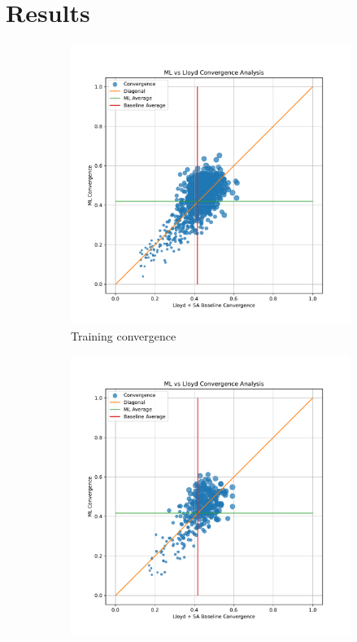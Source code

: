 \documentclass{article}
\begin{document}
\section{Results}

\begin{figure}[h]
  \centering
  \begin{subfigure}[t]{0.49\textwidth}
    \centering
    \includegraphics[width=\textwidth]{train_convergence.pdf}
    \caption{Training convergence}
  \end{subfigure}
  \begin{subfigure}[t]{0.49\textwidth}
    \centering
    \includegraphics[width=\textwidth]{test_convergence.pdf}

\end{subfigure}
\end{figure}
\end{document}
